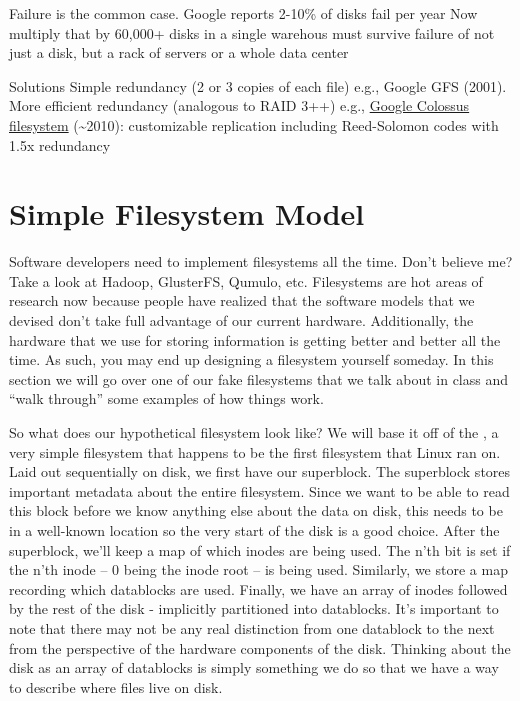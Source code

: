 Failure is the common case.
Google reports 2-10\% of disks fail per year Now multiply that by 60,000+ disks in a single warehous must survive failure of not just a disk, but a rack of servers or a whole data center

Solutions Simple redundancy (2 or 3 copies of each file) e.g., Google GFS (2001).
More efficient redundancy (analogous to RAID 3++) e.g., \href{http://goo.gl/LwFIy}{Google Colossus filesystem} (\textasciitilde{}2010): customizable replication including Reed-Solomon codes with 1.5x redundancy

\section{Simple Filesystem Model}

Software developers need to implement filesystems all the time. Don't believe me? Take a look at Hadoop, GlusterFS,
Qumulo, etc. Filesystems are hot areas of research now because people have realized that the software models that we
devised don't take full advantage of our current hardware. Additionally, the hardware that we use for storing information
is getting better and better all the time. As such, you may end up designing a filesystem yourself someday. In this
section we will go over one of our fake filesystems that we talk about in class and ``walk through'' some examples of
how things work.

So what does our hypothetical filesystem look like? We will base it off of the , a very simple filesystem
that happens to be the first filesystem that Linux ran on. Laid out sequentially on disk, we first have our superblock.
The superblock stores important metadata about the entire filesystem. Since we want to be able to read this block before
we know anything else about the data on disk, this needs to be in a well-known location so the very start of the disk is
a good choice. After the superblock, we'll keep a map of which inodes are being used. The n'th bit is set if the n'th
inode -- $0$ being the inode root -- is being used. Similarly, we store a map recording which datablocks are used.
Finally, we have an array of inodes followed by the rest of the disk - implicitly partitioned into datablocks. It's
important to note that there may not be any real distinction from one datablock to the next from the perspective of the
hardware components of the disk. Thinking about the disk as an array of datablocks is simply something we do so that we
have a way to describe where files live on disk.

